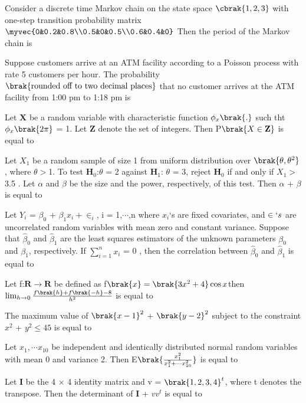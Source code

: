 \item Consider a discrete time Markov chain on the state space $\cbrak{1,2,3}$ with one-step transition  probability matrix $\myvec{0&0.2&0.8\\0.5&0&0.5\\0.6&0.4&0}$
Then the period of the Markov chain is 
\bigskip
\item Suppose customers arrive at an ATM facility according to a Poisson process with rate 5 customers per hour. The probability $\brak{\text{rounded off to two decimal places}}$ that no customer arrives at the ATM facility from 1:00 pm to 1:18 pm is
\bigskip
\item Let $\mathbf{X}$ be a random variable with characteristic function $\phi_{x}\brak{.}$ such tht $\phi_{x}\brak{2\pi}$ = 1. Let $\mathbf{Z}$ denote the set of integers. Then P$\brak {X \in \mathbf{Z}}$ is equal to
\bigskip
\item Let $X_1$ be a random sample of size 1 from uniform distribution over $\brak{\theta,\theta^2}$, where $\theta > $1. To test $\mathbf{H}_0$:$\theta$ = 2 against $\mathbf{H}_1$: $\theta$ = 3, reject $\mathbf{H}_0$ if and only if $X_1 > $3.5 . Let $\alpha$ and $\beta$ be the size and the power, respectively, of this test. Then $\alpha$ + $\beta$  is equal to
\bigskip
\item Let $Y_{i}$ = $\beta_0$ + $\beta_1x_i + \in_{i}$, i = 1,$\cdots$,n where $x_{i}$`s are fixed covariates, and $\in `s$ are uncorrelated random variables with mean zero and constant variance. Suppose that $\hat{\beta}_0$ and  $\hat{\beta}_1$ are the least squares estimators of the unknown parameters $\beta_0$ and $\beta_1$, respectively. If $\sum_{i=1}^{n}x_{i}$ = 0 , then the correlation between $\hat{\beta}_0$ and $\hat{\beta}_1$ is equal to
\bigskip
\item Let f:$\mathbf{R}\to\mathbf{R}$ be defined as f$\brak{x}=\brak{3x^2+4}\cos{x}$then $\lim_{h\to 0}\frac{f\brak{h}+f\brak{-h}-8}{h^2}$ is equal to
\bigskip
\item The maximum value of $\brak{x-1}^2$ + $\brak{y-2}^2$ subject to the constraint $x^2$ + $y^2 \leq 45$ is equal to
\bigskip
\item Let $x_1,\cdots x_{10}$ be independent and identically distributed normal random variables with mean 0 and variance 2. Then E$\brak{\frac{x_1^{2}}{x_1^{2}+\cdots x_{10}^2}}$ is equal to
\bigskip
\item Let $\mathbf{I}$ be the 4 $\times$ 4 identity matrix and v = $\brak{1, 2, 3, 4}^t$, where t denotes the transpose. Then the determinant of $\mathbf{I}$ + $vv^t$ is equal to

